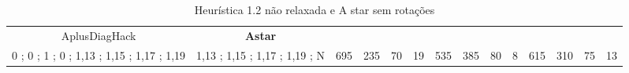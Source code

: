 \begin{table}[H]
{\begin{tabular}{|c|c|c|c|c|c|c|c|c|c|c|c|c|c|}
AplusDiagHack & \cellcolor{blue!15}\textbf{Astar}& {\color[HTML]{00009B} } & {\color[HTML]{9A0000} } & {\color[HTML]{009901} } &  & {\color[HTML]{00009B} } & {\color[HTML]{9A0000} } & {\color[HTML]{009901} } &  & {\color[HTML]{00009B} } & {\color[HTML]{9A0000} } & {\color[HTML]{009901} } &  \\ 
0 ; 0 ; 1 ; 0 ; 1,13 ; 1,15 ; 1,17 ; 1,19 & \cellcolor{ blue!15}1,13 ; 1,15 ; 1,17 ; 1,19 ; N & \multirow{-2}{*}{{\color[HTML]{00009B} 695}} & \multirow{-2}{*}{{\color[HTML]{9A0000} 235}} & \multirow{-2}{*}{{\color[HTML]{009901} 70}} & \multirow{-2}{*}{19} & \multirow{-2}{*}{{\color[HTML]{00009B} 535}} & \multirow{-2}{*}{{\color[HTML]{9A0000} 385}} & \multirow{-2}{*}{{\color[HTML]{009901} 80}} & \multirow{-2}{*}{8} & \multirow{-2}{*}{{\color[HTML]{00009B} 615}} & \multirow{-2}{*}{{\color[HTML]{9A0000} 310}} & \multirow{-2}{*}{{\color[HTML]{009901} 75}} & \multirow{-2}{*}{13} \\ \hline
\end{tabular}} \caption{Heurística 1.2 não relaxada e A star sem rotações} \label{ my - label} \end{table}
